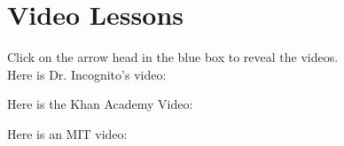 \documentclass{ximera}
\begin{document}
\section{Video Lessons}

Click on the arrow head in the blue box to reveal the videos.\\

Here is Dr. Incognito's video:
\begin{expandable}
\begin{center}
\end{center}
\end{expandable}

Here is the Khan Academy Video:
\begin{expandable}
\begin{center}
\end{center}
\end{expandable}

Here is an MIT video:
\begin{expandable}
\begin{center}
\end{center}
\end{expandable}
\end{document}
